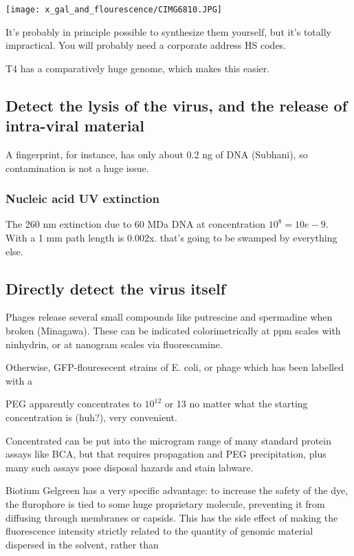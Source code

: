 \documentclass[paper.tex]{subfiles}
\begin{document}
\texttt{[image: x\_gal\_and\_flourescence/CIMG6810.JPG]}

 It’s probably in principle possible to synthesize them yourself, but it’s totally impractical. You will probably need a corporate address HS codes. 

T4 has a comparatively huge genome, which makes this easier.


\subsection{Detect the lysis of the virus, and the release of intra-viral material}

A fingerprint, for instance, has only about 0.2 ng of DNA (Subhani), so contamination is not a huge issue.



\subsubsection{Nucleic acid UV extinction }

The 260 nm extinction due to 60 MDa DNA at concentration $10^8 = 10e-9$. With a 1 mm path length is 0.002x. that's going to be swamped by everything else.


\subsection{Directly detect the virus itself}

Phages release several small compounds like putrescine and spermadine when broken (Minagawa\cite{characteristics1961}). These can be indicated colorimetrically at ppm scales with ninhydrin, or at nanogram scales via fluorescamine. 

Otherwise, GFP-flouresecent strains of E. coli, or phage which has been labelled with a 




PEG apparently concentrates to $10^{12}$ or 13 no matter what the starting concentration is (huh?), very convenient.

Concentrated can be put into the microgram range of many standard protein assays like BCA, but that requires propagation and PEG precipitation, plus many such assays pose disposal hazards and stain labware. 












Biotium Gelgreen has a very specific advantage: to increase the safety of the dye, the flurophore is tied to some huge proprietary molecule, preventing it from diffusing through membranes or capsids. This has the side effect of making the fluorescence intensity strictly related to the quantity of genomic material dispersed in the solvent, rather than 
\end{document}
